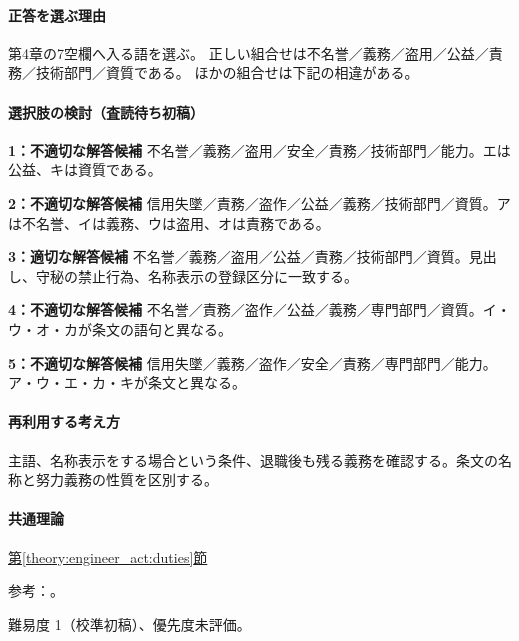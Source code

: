 \paragraph{正答を選ぶ理由} 第4章の7空欄へ入る語を選ぶ。 正しい組合せは不名誉／義務／盗用／公益／責務／技術部門／資質である。 ほかの組合せは下記の相違がある。

\paragraph{選択肢の検討（査読待ち初稿）}\mbox{}\par

\noindent\textbf{1：不適切な解答候補} 不名誉／義務／盗用／安全／責務／技術部門／能力。エは公益、キは資質である。\par

\noindent\textbf{2：不適切な解答候補} 信用失墜／責務／盗作／公益／義務／技術部門／資質。アは不名誉、イは義務、ウは盗用、オは責務である。\par

\noindent\textbf{3：適切な解答候補} 不名誉／義務／盗用／公益／責務／技術部門／資質。見出し、守秘の禁止行為、名称表示の登録区分に一致する。\par

\noindent\textbf{4：不適切な解答候補} 不名誉／責務／盗作／公益／義務／専門部門／資質。イ・ウ・オ・カが条文の語句と異なる。\par

\noindent\textbf{5：不適切な解答候補} 信用失墜／義務／盗作／安全／責務／専門部門／能力。ア・ウ・エ・カ・キが条文と異なる。\par

\paragraph{再利用する考え方} 主語、名称表示をする場合という条件、退職後も残る義務を確認する。条文の名称と努力義務の性質を区別する。

\paragraph{共通理論} \hyperref[theory:engineer_act:duties]{第\ref*{theory:engineer_act:duties}節}

\par 参考：\cite{engineer_act_current}。

\par 難易度 1（校準初稿）、優先度未評価。

